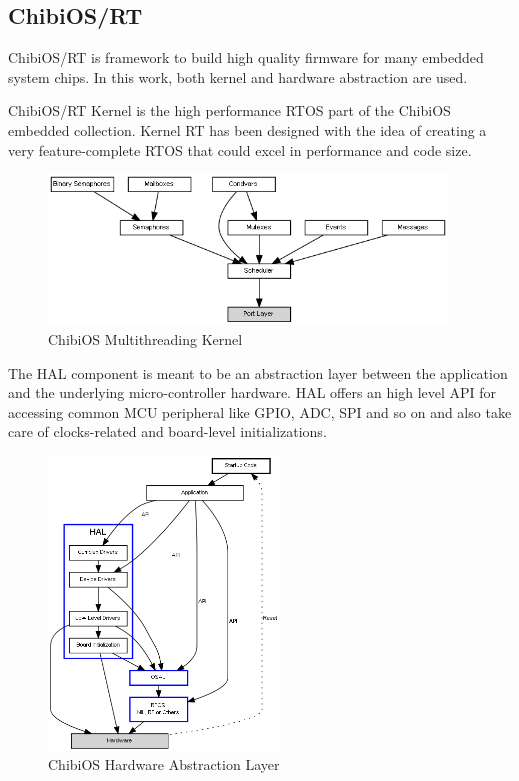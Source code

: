 \documentclass[12pt,]{book}
\begin{document}
	\subsection{ChibiOS/RT}
	ChibiOS/RT is framework to build high quality firmware for many embedded system chips.
	In this work, both kernel and hardware abstraction are used.
	
	ChibiOS/RT Kernel is the high performance RTOS part of the ChibiOS embedded collection.
	Kernel RT has been designed with the idea of creating a very feature-complete RTOS that could excel in performance and code size.
	
	\begin{figure}[h]
		\centering
		\includegraphics[width=300pt]{images/chibios_kernel}
		\caption{ChibiOS Multithreading Kernel}
	\end{figure}
	
	\newpage
	The HAL component is meant to be an abstraction layer between the application and the underlying micro-controller hardware.
	HAL offers an high level API for accessing common MCU peripheral like GPIO, ADC, SPI and so on and also take care of clocks-related and board-level initializations.
	
	\begin{figure}[h]
		\centering
		\includegraphics[width=175pt]{images/chibios_hal_arch}
		\caption{ChibiOS Hardware Abstraction Layer}
	\end{figure}
\end{document}
